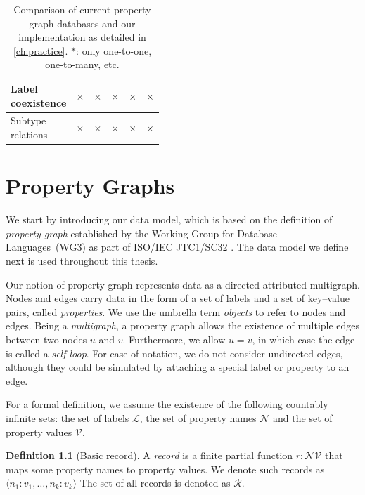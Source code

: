\documentclass{report}
\makeatletter
\theoremstyle{definition}
\newtheorem{definition}{Definition}
\newcommand{\pto}{}%
\DeclareRobustCommand{\pto}{\mathrel{\mathpalette\p@to@gets\to}}
\newcommand{\p@to@gets}[2]{%
  \ooalign{\hidewidth$\m@th#1\mapstochar\mkern5mu$\hidewidth\cr$\m@th#1\to$\cr}%
}
\newcommand{\no}{\cellcolor{lightred}\color{red}$\times$}
\makeatother
\begin{document}
\begin{table}[t]
\begin{tabular}{lccccc}
    \hline
    \makecell[l]{Label                                                                                         \\coexistence} & \no                & \no                 & \no                 & \no                 & \no            \\
    \hline
    \makecell[l]{Subtype                                                                                       \\relations} & \no                & \no                 & \no                 & \no                 & \no           \\
    \hline
  \end{tabular}
  \caption[Comparison of current property graph databases and our implementation]{Comparison of current property graph databases and our implementation as detailed in \autoref{ch:practice}. $*$: only one-to-one, one-to-many, etc.}
  \label{tab:pg-schema-databases}
\end{table}

\chapter{Property Graphs}

We start by introducing our data model, which is based on the definition of \emph{property graph} established by the Working Group for Database Languages~(WG3) as part of ISO/IEC JTC1/SC32 \citep{deutsch2021gpml}. The data model we define next is used throughout this thesis.

Our notion of property graph represents data as a directed attributed multigraph. Nodes and edges carry data in the form of a set of labels and a set of key--value pairs, called \emph{properties}. We use the umbrella term \emph{objects} to refer to nodes and edges. Being a \emph{multigraph}, a property graph allows the existence of multiple edges between two nodes $u$ and $v$. Furthermore, we allow $u = v$, in which case the edge is called a \emph{self-loop}. For ease of notation, we do not consider undirected edges, although they could be simulated by attaching a special label or property to an edge.

For a formal definition, we assume the existence of the following countably infinite sets: the set of labels $\mathcal{L}$, the set of property names $\mathcal{N}$ and the set of property values $\mathcal{V}$.

\begin{definition}[Basic record]
  \label{def:record-basic}
  A \emph{record} is a finite partial function $r : \mathcal{N} \pto \mathcal{V}$ that maps some property names to property values. We denote such records as $\langle n_1 : v_1, \ldots, n_k : v_k \rangle$ The set of all records is denoted as $\mathcal{R}$.
\end{definition}
\end{document}
